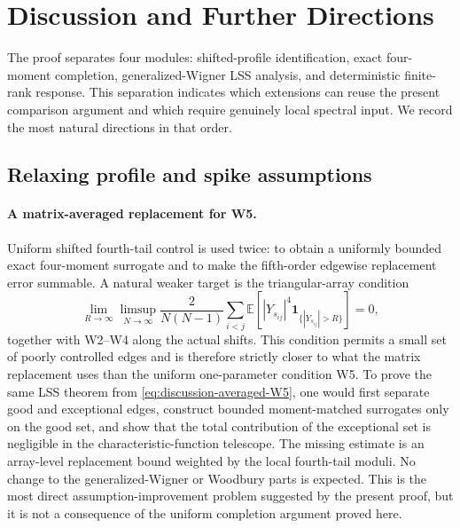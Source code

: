 \documentclass[11pt]{article}
\theoremstyle{definition}
\theoremstyle{remark}
\newcommand{\E}{\mathbb E}
\newcommand{\one}{\mathbf 1}
\begin{document}
\section{Discussion and Further Directions}\label{sec:discussion}

The proof separates four modules: shifted-profile identification, exact
four-moment completion, generalized-Wigner LSS analysis, and deterministic
finite-rank response.  This separation indicates which extensions can reuse
the present comparison argument and which require genuinely local spectral
input.  We record the most natural directions in that order.

\subsection{Relaxing profile and spike assumptions}
\label{subsec:discussion-assumptions}

\paragraph*{A matrix-averaged replacement for W5.}
Uniform shifted fourth-tail control is used twice: to obtain a uniformly
bounded exact four-moment surrogate and to make the fifth-order edgewise
replacement error summable.  A natural weaker target is the triangular-array
condition
\begin{equation}\label{eq:discussion-averaged-W5}
 \lim_{R\to\infty}\limsup_{N\to\infty}
 \frac{2}{N(N-1)}\sum_{i<j}
 \E\left[|Y_{s_{ij}}|^4
 \one_{\{|Y_{s_{ij}}|>R\}}\right]=0,
\end{equation}
together with W2--W4 along the actual shifts.  This condition permits a small
set of poorly controlled edges and is therefore strictly closer to what the
matrix replacement uses than the uniform one-parameter condition W5.  To
prove the same LSS theorem from \eqref{eq:discussion-averaged-W5}, one would
first separate good and exceptional edges, construct bounded moment-matched
surrogates only on the good set, and show that the total contribution of the
exceptional set is negligible in the characteristic-function telescope.  The
missing estimate is an array-level replacement bound weighted by the local
fourth-tail moduli.  No change to the generalized-Wigner or Woodbury parts is
expected.  This is the most direct assumption-improvement problem suggested
by the present proof, but it is not a consequence of the uniform completion
argument proved here.
\end{document}

